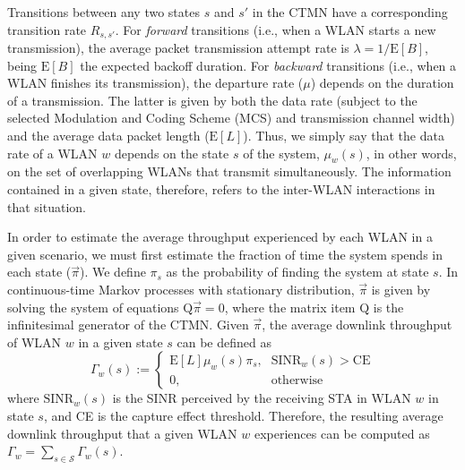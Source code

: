 \documentclass{article}
\begin{document}
Transitions between any two states $s$ and $s'$ in the CTMN have a corresponding transition rate $R_{s,s'}$. For \textit{forward} transitions (i.e., when a WLAN starts a new transmission), the average packet transmission attempt rate is $\lambda = 1/\text{E}[B]$, being $\text{E}[B]$ the expected backoff duration. For \textit{backward} transitions (i.e., when a WLAN finishes its transmission), the departure rate ($\mu$) depends on the duration of a transmission. The latter is given by both the data rate (subject to the selected Modulation and Coding Scheme (MCS) and transmission channel width) and the average data packet length ($\text{E}[L]$). Thus, we simply say that the data rate of a WLAN $w$ depends on the state $s$ of the system, $\mu_{w}(s)$, in other words, on the set of overlapping WLANs that transmit simultaneously. The information contained in a given state, therefore, refers to the inter-WLAN interactions in that situation.

In order to estimate the average throughput experienced by each WLAN in a given scenario, we must first estimate the fraction of time the system spends in each state ($\vec{\pi}$). We define $\pi_s$ as the probability of finding the system at state $s$. In continuous-time Markov processes with stationary distribution, $\vec{\pi}$ is given by solving the system of equations $\text{Q} \vec{\pi} = 0$, where the matrix item $\text{Q}$ is the infinitesimal generator of the CTMN.
Given $\vec{\pi}$, the average downlink throughput of WLAN $w$ in a given state $s$ can be defined as
\begin{equation*}
\Gamma_{w}(s) := \begin{cases} 
\text{E}[L]  \mu_w(s) \pi_s  \text{,}  & \text{SINR}_{w}(s) > \text{CE} \\
0 \text{,} & \text{otherwise}
\end{cases}
\end{equation*}
where $\text{SINR}_{w}(s)$ is the SINR perceived by the receiving STA in WLAN $w$ in state $s$, and CE is the capture effect threshold.	Therefore, the resulting average downlink throughput that a given WLAN $w$ experiences can be computed as $\Gamma_w = \sum_{s \in \mathcal{S}}^{}\Gamma_{w}(s) $.

\end{document}
